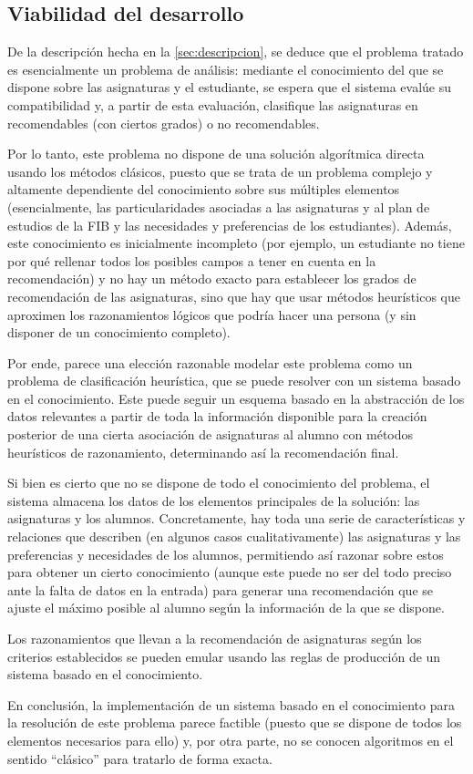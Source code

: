 
\subsection{Viabilidad del desarrollo} \label{sec:viabilidad}

De la descripción hecha en la \autoref{sec:descripcion}, se deduce que el 
problema tratado es esencialmente un problema de análisis: mediante el 
conocimiento del que se dispone sobre las asignaturas y el estudiante, se 
espera que el sistema evalúe su compatibilidad y, a partir de esta evaluación, 
clasifique las asignaturas en recomendables (con ciertos grados) o no 
recomendables.

Por lo tanto, este problema no dispone de una solución algorítmica directa 
usando los métodos clásicos, puesto que se trata de un problema complejo y 
altamente dependiente del conocimiento sobre sus múltiples elementos 
(esencialmente, las particularidades asociadas a las asignaturas y al plan de 
estudios de la FIB y las necesidades y preferencias de los estudiantes). 
Además, este conocimiento es inicialmente incompleto (por ejemplo, un 
estudiante no tiene por qué rellenar todos los posibles campos a tener en 
cuenta en la recomendación) y no hay un método exacto para establecer los 
grados de recomendación de las asignaturas, sino que hay que usar métodos 
heurísticos que aproximen los razonamientos lógicos que podría hacer una 
persona (y sin disponer de un conocimiento completo).

Por ende, parece una elección razonable modelar este problema como un problema 
de clasificación heurística, que se puede resolver con un sistema basado en el 
conocimiento. Este puede seguir un esquema basado en la abstracción de los 
datos relevantes a partir de toda la información disponible para la creación 
posterior de una cierta asociación de asignaturas al alumno con métodos 
heurísticos de razonamiento, determinando así la recomendación final.

Si bien es cierto que no se dispone de todo el conocimiento del problema, el 
sistema almacena los datos de los elementos principales de la solución: las 
asignaturas y los alumnos. Concretamente, hay toda una serie de 
características y relaciones que describen (en algunos casos cualitativamente) 
las asignaturas y las preferencias y necesidades de los alumnos, permitiendo 
así razonar sobre estos para obtener un cierto conocimiento (aunque este puede 
no ser del todo preciso ante la falta de datos en la entrada) para generar 
una recomendación que se ajuste el máximo posible al alumno según la 
información de la que se dispone.

Los razonamientos que llevan a la recomendación de asignaturas según los 
criterios establecidos se pueden emular usando las reglas de producción de 
un sistema basado en el conocimiento.

En conclusión, la implementación de un sistema basado en el conocimiento para 
la resolución de este problema parece factible (puesto que se dispone de todos 
los elementos necesarios para ello) y, por otra parte, no se conocen 
algoritmos en el sentido ``clásico'' para tratarlo de forma exacta.


